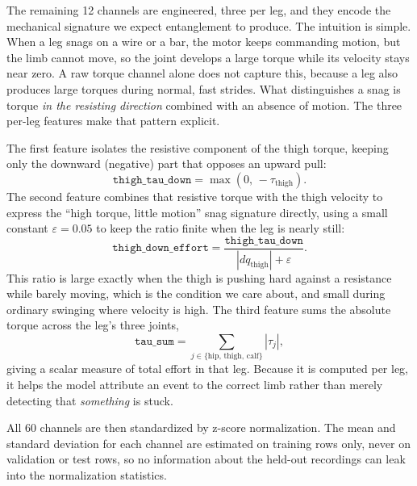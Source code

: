 \documentclass[conference]{IEEEtran}
\begin{document}
The remaining 12 channels are engineered, three per leg, and they encode the mechanical signature we expect entanglement to produce. The intuition is simple. When a leg snags on a wire or a bar, the motor keeps commanding motion, but the limb cannot move, so the joint develops a large torque while its velocity stays near zero. A raw torque channel alone does not capture this, because a leg also produces large torques during normal, fast strides. What distinguishes a snag is torque \emph{in the resisting direction} combined with an absence of motion. The three per-leg features make that pattern explicit.

The first feature isolates the resistive component of the thigh torque, keeping only the downward (negative) part that opposes an upward pull:
\begin{equation}
\texttt{thigh\_tau\_down} = \max(0,\, -\tau_{\text{thigh}}).
\end{equation}
The second feature combines that resistive torque with the thigh velocity to express the ``high torque, little motion'' snag signature directly, using a small constant $\varepsilon = 0.05$ to keep the ratio finite when the leg is nearly still:
\begin{equation}
\texttt{thigh\_down\_effort} = \frac{\texttt{thigh\_tau\_down}}{|dq_{\text{thigh}}| + \varepsilon}.
\end{equation}
This ratio is large exactly when the thigh is pushing hard against a resistance while barely moving, which is the condition we care about, and small during ordinary swinging where velocity is high. The third feature sums the absolute torque across the leg's three joints,
\begin{equation}
\texttt{tau\_sum} = \sum_{j \in \{\text{hip},\,\text{thigh},\,\text{calf}\}} |\tau_j|,
\end{equation}
giving a scalar measure of total effort in that leg. Because it is computed per leg, it helps the model attribute an event to the correct limb rather than merely detecting that \emph{something} is stuck.

All 60 channels are then standardized by z-score normalization. The mean and standard deviation for each channel are estimated on training rows only, never on validation or test rows, so no information about the held-out recordings can leak into the normalization statistics.
\end{document}
